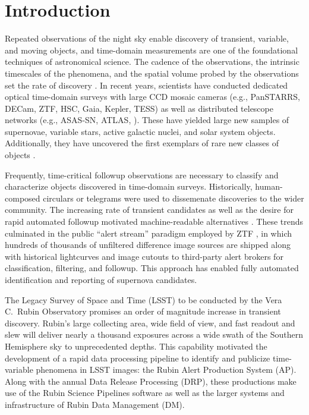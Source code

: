 \section{Introduction}

Repeated observations of the night sky enable discovery of transient, variable, and moving objects, and time-domain measurements are one of the foundational techniques of astronomical science.
The cadence of the observations, the intrinsic timescales of the phenomena, and the spatial volume probed by the observations set the rate of discovery  .
In recent years, scientists have conducted dedicated optical time-domain surveys with large CCD mosaic cameras (e.g., PanSTARRS, DECam, ZTF, HSC, Gaia, Kepler, TESS) as well as distributed telescope networks (e.g., ASAS-SN, ATLAS, ).
These have yielded large new samples of supernovae, variable stars, active galactic nuclei, and solar system objects.
Additionally, they have uncovered the first exemplars of rare new classes of objects .

Frequently, time-critical followup observations are necessary to classify and characterize objects discovered in time-domain surveys.
Historically, human-composed circulars or telegrams were used to dissemenate discoveries to the wider community.
The increasing rate of transient candidates as well as the desire for rapid automated followup motivated machine-readable alternatives .
These trends culminated in the public ``alert stream'' paradigm employed by ZTF , in which hundreds of thousands of unfiltered difference image sources are shipped along with historical lightcurves and image cutouts to third-party alert brokers  for classification, filtering, and followup.
This approach has enabled fully automated identification and reporting of supernova candidates.

The Legacy Survey of Space and Time (LSST) to be conducted by the Vera C.\ Rubin Observatory promises an order of magnitude  increase in transient discovery.
Rubin's large collecting area, wide field of view, and fast readout and slew will deliver nearly a thousand  exposures across a wide swath of the Southern Hemisphere sky to unprecedented depths.
This capability motivated the development of a rapid data processing pipeline to identify and publicize time-variable phenomena in LSST images: the Rubin Alert Production System (AP).
Along with the annual Data Release Processing (DRP), these productions make use of the Rubin Science Pipelines software as well as the larger systems and infrastructure of Rubin Data Management (DM).

